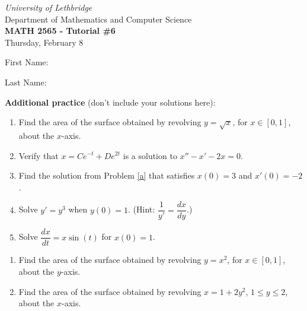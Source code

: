 \documentclass[12pt]{article}
\newcommand{\skipline}{\vspace{12pt}}
\begin{document}
\author{Instructor: Sean Fitzpatrick}
\thispagestyle{empty}
\begin{center}
\emph{University of Lethbridge}\\
Department of Mathematics and Computer Science\\
{\bf MATH 2565 - Tutorial \#6}\\
Thursday, February 8
\end{center}
\skipline \skipline \skipline \noindent \skipline

\skipline
First Name:\underline{\hspace{348pt}}\\
\skipline

\vspace{1cm}

Last Name:\underline{\hspace{351pt}}



\vspace{2cm}


\vspace{2cm}


\textbf{Additional practice} (don't include your solutions here):
\begin{enumerate}
  \item Find the area of the surface obtained by revolving $y=\sqrt{x}$, for $x\in [0,1]$, about the $x$-axis.

 \item Verify that $x=Ce^{-t}+De^{2t}$ is a solution to $x''-x'-2x=0$.\label{a}
 \item Find the solution from Problem \ref{a} that satisfies $x(0)=3$ and $x'(0)=-2$.
\item Solve $y'=y^3$ when $y(0)=1$. (Hint: $\dfrac{1}{y'} = \dfrac{dx}{dy}$.)
 
 
 
 \item Solve $\dfrac{dx}{dt} = x\sin(t)$ for $x(0)=1$.

\end{enumerate}

\newpage





 \begin{enumerate}



 
 \item Find the area of the surface obtained by revolving $y=x^2$, for $x\in [0,1]$, about the $y$-axis.
 
 \vspace{4in}
 
 \item Find the area of the surface obtained by revolving $x=1+2y^2$, $1\leq y\leq 2$, about the $x$-axis.



 
 
\end{enumerate}
\end{document}
